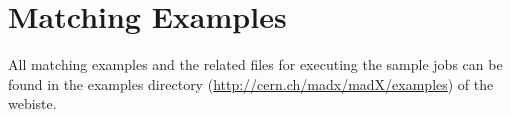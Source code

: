 


%
 
\section{Matching Examples}
\label{sec:match-examples}

All matching examples and the related files for executing the \madx
sample jobs can be found in the examples directory
(\href{http://cern.ch/madx/madX/examples}{http://cern.ch/madx/madX/examples})
of the \madx webiste.
  
